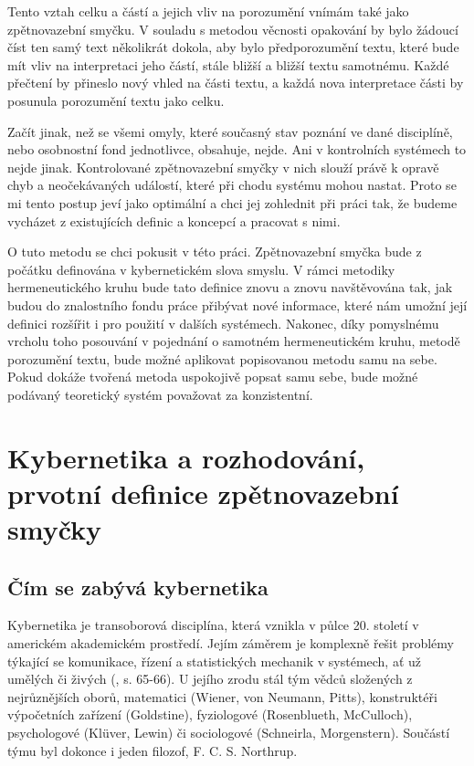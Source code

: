 \documentclass[11pt,a4paper]{article}
\begin{document}
Tento vztah celku a částí a jejich vliv na porozumění vnímám také jako zpětnovazební smyčku. V souladu s metodou věcnosti opakování by bylo žádoucí číst ten samý text několikrát dokola, aby bylo předporozumění textu, které bude mít vliv na interpretaci jeho částí, stále bližší a bližší textu samotnému. Každé přečtení by přineslo nový vhled na části textu, a každá nova interpretace části by posunula porozumění textu jako celku. 

Začít jinak, než se všemi omyly, které současný stav poznání ve dané disciplíně, nebo osobnostní fond jednotlivce, obsahuje, nejde. Ani v  kontrolních systémech to nejde jinak. Kontrolované zpětnovazební smyčky v nich slouží právě k opravě chyb a neočekávaných událostí, které při chodu systému mohou nastat. Proto se mi tento postup jeví jako optimální a chci jej zohlednit při práci tak, že budeme vycházet z existujících definic a koncepcí a pracovat s nimi.

O tuto metodu se chci pokusit v této práci. Zpětnovazební smyčka bude z počátku definována v kybernetickém slova smyslu. V rámci metodiky hermeneutického kruhu bude tato definice znovu a znovu navštěvována tak, jak budou do znalostního fondu práce přibývat nové informace, které nám umožní její definici rozšířit i pro použití v dalších systémech. Nakonec, díky pomyslnému vrcholu toho posouvání v pojednání o samotném hermeneutickém kruhu, metodě porozumění textu, bude možné aplikovat popisovanou metodu samu na sebe. Pokud dokáže tvořená metoda uspokojivě popsat samu sebe, bude možné podávaný teoretický systém považovat za konzistentní. 

\pagebreak


\section{Kybernetika a rozhodování, prvotní definice zpětnovazební smyčky}

\subsection{Čím se zabývá kybernetika}
Kybernetika je transoborová disciplína, která vznikla v půlce 20. století v americkém akademickém prostředí. Jejím záměrem je komplexně řešit problémy týkající se komunikace, řízení a statistických mechanik v systémech, ať už umělých či živých (\cite{wiener_cybernetics_2019}, s. 65-66). U jejího zrodu stál tým vědců složených z nejrůznějších oborů, matematici (Wiener, von Neumann, Pitts), konstruktéři výpočetních zařízení (Goldstine), fyziologové (Rosenblueth, McCulloch), psychologové (Klüver, Lewin)  či sociologové (Schneirla, Morgenstern).  Součástí týmu byl dokonce i jeden filozof, F. C. S. Northrup. 
\end{document}
